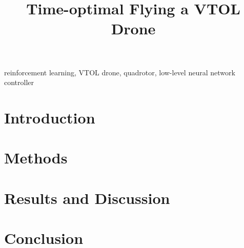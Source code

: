 \documentclass[conference]{IEEEtran}
\begin{document}
\title{Time-optimal Flying a VTOL Drone}

\author{
}

\maketitle


\begin{abstract}
\label{abstract}

\end{abstract}

\begin{IEEEkeywords}
reinforcement learning, VTOL drone, quadrotor, low-level neural network controller
\end{IEEEkeywords}

\section{Introduction}
\label{sec:introduction}


\section{Methods}
\label{sec:methods}


\section{Results and Discussion}
\label{sec:results}


\section{Conclusion}
\label{sec:conclusion}





\end{document}
